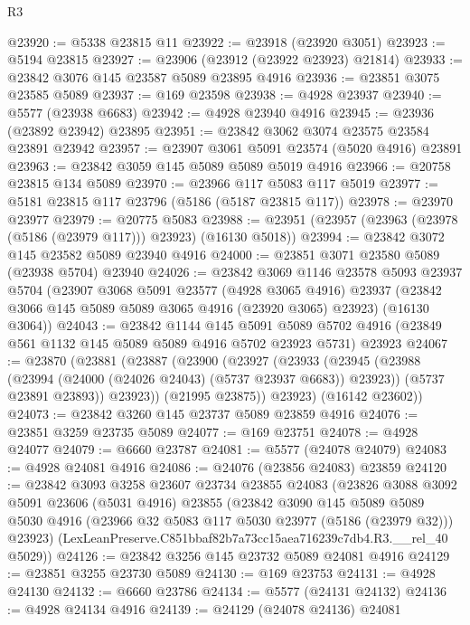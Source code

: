 \begin{lexlean}{R3}
\begin{coremodule}
@23920 := @5338 @23815 @11
@23922 := @23918 (@23920 @3051)
@23923 := @5194 @23815
@23927 := @23906 (@23912 (@23922 @23923) @21814)
@23933 := @23842 @3076 @145 @23587 @5089 @23895 @4916
@23936 := @23851 @3075 @23585 @5089
@23937 := @169 @23598
@23938 := @4928 @23937
@23940 := @5577 (@23938 @6683)
@23942 := @4928 @23940 @4916
@23945 := @23936 (@23892 @23942) @23895
@23951 := @23842 @3062 @3074 @23575 @23584 @23891 @23942
@23957 := @23907 @3061 @5091 @23574 (@5020 @4916) @23891
@23963 := @23842 @3059 @145 @5089 @5089 @5019 @4916
@23966 := @20758 @23815 @134 @5089
@23970 := @23966 @117 @5083 @117 @5019
@23977 := @5181 @23815 @117 @23796 (@5186 (@5187 @23815 @117))
@23978 := @23970 @23977
@23979 := @20775 @5083
@23988 := @23951 (@23957 (@23963 (@23978 (@5186 (@23979 @117))) @23923) (@16130 @5018))
@23994 := @23842 @3072 @145 @23582 @5089 @23940 @4916
@24000 := @23851 @3071 @23580 @5089 (@23938 @5704) @23940
@24026 := @23842
    @3069
    @1146
    @23578
    @5093
    @23937
    @5704
    (@23907
      @3068
      @5091
      @23577
      (@4928 @3065 @4916)
      @23937
      (@23842 @3066 @145 @5089 @5089 @3065 @4916 (@23920 @3065) @23923)
      (@16130 @3064))
@24043 := @23842
    @1144
    @145
    @5091
    @5089
    @5702
    @4916
    (@23849 @561 @1132 @145 @5089 @5089 @4916 @5702 @23923 @5731)
    @23923
@24067 := @23870
    (@23881
      (@23887
        (@23900
          (@23927
            (@23933
              (@23945
                (@23988 (@23994 (@24000 (@24026 @24043) (@5737 @23937 @6683)) @23923))
                (@5737 @23891 @23893))
              @23923))
          (@21995 @23875))
        @23923)
      (@16142 @23602))
@24073 := @23842 @3260 @145 @23737 @5089 @23859 @4916
@24076 := @23851 @3259 @23735 @5089
@24077 := @169 @23751
@24078 := @4928 @24077
@24079 := @6660 @23787
@24081 := @5577 (@24078 @24079)
@24083 := @4928 @24081 @4916
@24086 := @24076 (@23856 @24083) @23859
@24120 := @23842
    @3093
    @3258
    @23607
    @23734
    @23855
    @24083
    (@23826
      @3088
      @3092
      @5091
      @23606
      (@5031 @4916)
      @23855
      (@23842
        @3090
        @145
        @5089
        @5089
        @5030
        @4916
        (@23966 @32 @5083 @117 @5030 @23977 (@5186 (@23979 @32)))
        @23923)
      (LexLeanPreserve.C851bbaf82b7a73cc15aea716239c7db4.R3.__rel_40 @5029))
@24126 := @23842 @3256 @145 @23732 @5089 @24081 @4916
@24129 := @23851 @3255 @23730 @5089
@24130 := @169 @23753
@24131 := @4928 @24130
@24132 := @6660 @23786
@24134 := @5577 (@24131 @24132)
@24136 := @4928 @24134 @4916
@24139 := @24129 (@24078 @24136) @24081

\end{coremodule}
\end{lexlean}

